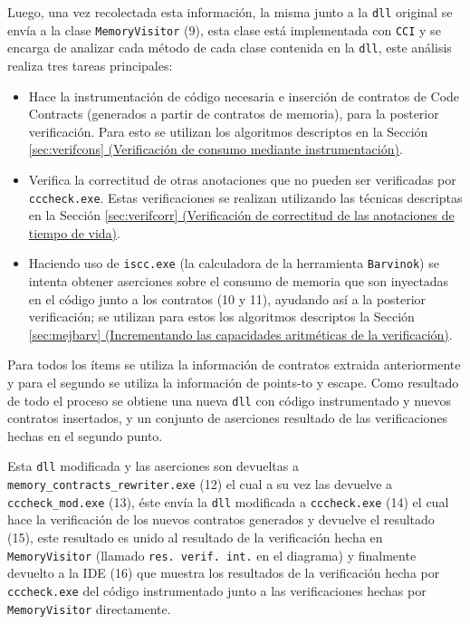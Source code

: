 \documentclass[12pt,a4paper]{article}
\newcommand\mono[1]{\texttt{#1}}
\begin{document}
			Luego, una vez recolectada esta información, la misma junto a la \mono{dll} original se envía a la clase \mono{MemoryVisitor} (9), esta clase está implementada con \mono{CCI} y se encarga de analizar cada método de cada clase contenida en la \mono{dll}, este análisis realiza tres tareas principales:
				\begin{itemize}
					\item Hace la instrumentación de código necesaria e inserción de contratos de Code Contracts (generados a partir de contratos de memoria), para la posterior verificación. Para esto se utilizan los algoritmos descriptos en la Sección \hyperref[sec:verifcons]{\ref*{sec:verifcons} (Verificación de consumo mediante instrumentación)}.
					\item Verifica la correctitud de otras anotaciones que no pueden ser verificadas por \mono{cccheck.exe}. Estas verificaciones se realizan utilizando las técnicas descriptas en la Sección \hyperref[sec:verifcorr]{\ref*{sec:verifcorr} (Verificación de correctitud de las anotaciones de tiempo de vida)}.
					\item Haciendo uso de \mono{iscc.exe} (la calculadora de la herramienta \mono{Barvinok}) se intenta obtener aserciones sobre el consumo de memoria que son inyectadas en el código junto a los contratos (10 y 11), ayudando así a la posterior verificación; se utilizan para estos los algoritmos descriptos la Sección \hyperref[sec:mejbarv]{\ref*{sec:mejbarv} (Incrementando las capacidades aritméticas de la verificación)}.
				\end{itemize}
			Para todos los ítems se utiliza la información de contratos extraida anteriormente y para el segundo se utiliza la información de points-to y escape. Como resultado de todo el proceso se obtiene una nueva \mono{dll} con código instrumentado y nuevos contratos insertados, y un conjunto de aserciones resultado de las verificaciones hechas en el segundo punto.

			Esta \mono{dll} modificada y las aserciones son devueltas a \mono{memory\_contracts\_rewriter.exe} (12) el cual a su vez las devuelve a \mono{cccheck\_mod.exe} (13), éste envía la \mono{dll} modificada a \mono{cccheck.exe} (14) el cual hace la verificación de los nuevos contratos generados y devuelve el resultado (15), este resultado es unido al resultado de la verificación hecha en \mono{MemoryVisitor} (llamado \mono{res. verif. int.} en el diagrama) y finalmente devuelto a la IDE (16) que muestra los resultados de la verificación hecha por \mono{cccheck.exe} del código instrumentado junto a las verificaciones hechas por \mono{MemoryVisitor} directamente.
\end{document}
